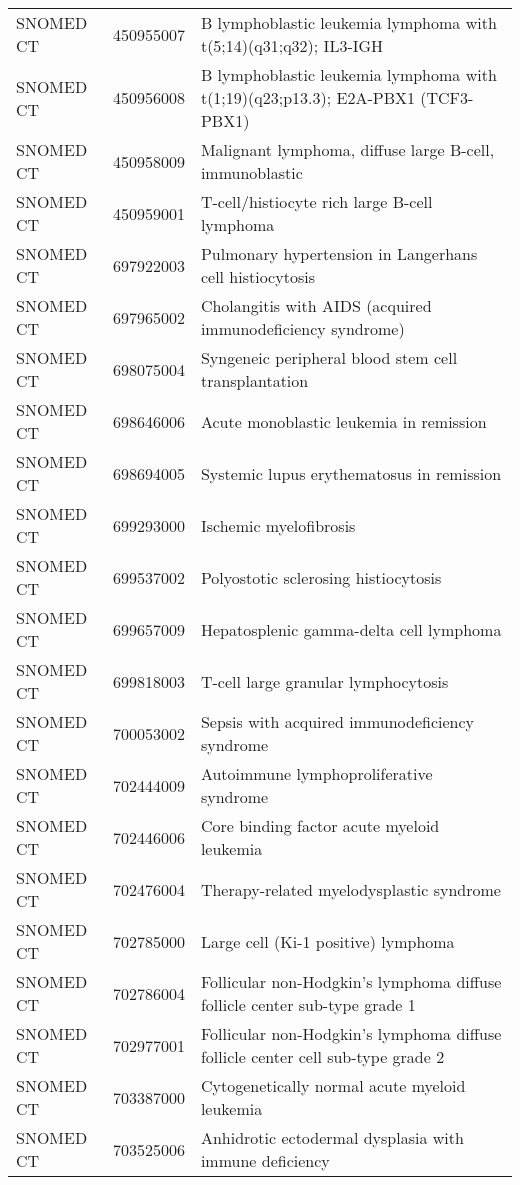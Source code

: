 \begin{longtable}{p{}p{}p{}}
  SNOMED CT & 450955007 & B lymphoblastic leukemia lymphoma with t(5;14)(q31;q32); IL3-IGH \\ 
  SNOMED CT & 450956008 & B lymphoblastic leukemia lymphoma with t(1;19)(q23;p13.3); E2A-PBX1 (TCF3-PBX1) \\ 
  SNOMED CT & 450958009 & Malignant lymphoma, diffuse large B-cell, immunoblastic \\ 
  SNOMED CT & 450959001 & T-cell/histiocyte rich large B-cell lymphoma \\ 
  SNOMED CT & 697922003 & Pulmonary hypertension in Langerhans cell histiocytosis \\ 
  SNOMED CT & 697965002 & Cholangitis with AIDS (acquired immunodeficiency syndrome) \\ 
  SNOMED CT & 698075004 & Syngeneic peripheral blood stem cell transplantation \\ 
  SNOMED CT & 698646006 & Acute monoblastic leukemia in remission \\ 
  SNOMED CT & 698694005 & Systemic lupus erythematosus in remission \\ 
  SNOMED CT & 699293000 & Ischemic myelofibrosis \\ 
  SNOMED CT & 699537002 & Polyostotic sclerosing histiocytosis \\ 
  SNOMED CT & 699657009 & Hepatosplenic gamma-delta cell lymphoma \\ 
  SNOMED CT & 699818003 & T-cell large granular lymphocytosis \\ 
  SNOMED CT & 700053002 & Sepsis with acquired immunodeficiency syndrome \\ 
  SNOMED CT & 702444009 & Autoimmune lymphoproliferative syndrome \\ 
  SNOMED CT & 702446006 & Core binding factor acute myeloid leukemia \\ 
  SNOMED CT & 702476004 & Therapy-related myelodysplastic syndrome \\ 
  SNOMED CT & 702785000 & Large cell (Ki-1 positive) lymphoma \\ 
  SNOMED CT & 702786004 & Follicular non-Hodgkin's lymphoma diffuse follicle center sub-type grade 1 \\ 
  SNOMED CT & 702977001 & Follicular non-Hodgkin's lymphoma diffuse follicle center cell sub-type grade 2 \\ 
  SNOMED CT & 703387000 & Cytogenetically normal acute myeloid leukemia \\ 
  SNOMED CT & 703525006 & Anhidrotic ectodermal dysplasia with immune deficiency \\ 

\end{longtable}
